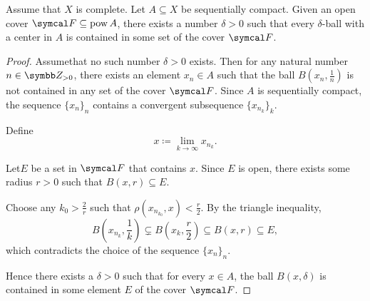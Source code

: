 \begin{lemma}\label{thm:lebesgues_covering_lemma}
  Assume that \( X \) is complete. Let \( A \subseteq X \) be sequentially compact. Given an open cover \( \Cal{F} \subseteq \Pow A \), there exists a number \( \delta > 0 \) such that every \( \delta \)-ball with a center in \( A \) is contained in some set of the cover \( \Cal{F} \).
\end{lemma}
\begin{proof}
  Assume\LEM that no such number \( \delta > 0 \) exists. Then for any natural number \( n \in \BZ_{>0} \), there exists an element \( x_n \in A \) such that the ball \( B(x_n, \frac 1 n) \) is not contained in any set of the cover \( \Cal{F} \). Since \( A \) is sequentially compact, the sequence \( \{ x_n \}_n \) contains a convergent subsequence \( \{ x_{n_k} \}_k \).

  Define
  \begin{equation*}
    x \coloneqq \lim_{k \to \infty} x_{n_k}.
  \end{equation*}

  Let\AOC \( E \) be a set in \( \Cal{F} \) that contains \( x \). Since \( E \) is open, there exists some radius \( r > 0 \) such that \( B(x, r) \subseteq E \).

  Choose any \( k_0 > \frac 2 r \) such that \( \rho(x_{n_{k_0}}, x) < \frac r 2 \). By the triangle inequality,
  \begin{equation*}
    B \left(x_{n_k}, \frac 1 k \right) \subsetneq B \left(x_k, \frac r 2 \right) \subseteq B(x, r) \subseteq E,
  \end{equation*}
  which contradicts the choice of the sequence \( \{ x_n \}_n \).

  Hence there exists a \( \delta > 0 \) such that for every \( x \in A \), the ball \( B(x, \delta) \) is contained in some element \( E \) of the cover \( \Cal{F} \).
\end{proof}

